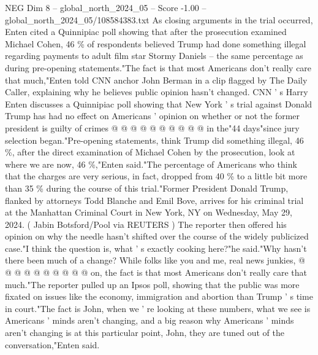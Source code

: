 \begin{textsample}{NEG Dim 8 – global\_north\_2024\_05 – Score -1.00 – global\_north\_2024\_05/108584383.txt}
As closing arguments in the trial occurred, Enten cited a Quinnipiac poll showing that after the prosecution examined Michael Cohen, 46 \% of respondents believed Trump had done something illegal regarding payments to adult film star Stormy Daniels -- the same percentage as during pre-opening statements."The fact is that most Americans don't really care that much,"Enten told CNN anchor John Berman in a clip flagged by The Daily Caller, explaining why he believes public opinion hasn't changed.
CNN ' s Harry Enten discusses a Quinnipiac poll showing that New York ' s trial against Donald Trump has had no effect on Americans ' opinion on whether or not the former president is guilty of crimes @ @ @ @ @ @ @ @ @ @ in the"44 days"since jury selection began."Pre-opening statements, think Trump did something illegal, 46 \%, after the direct examination of Michael Cohen by the prosecution, look at where we are now, 46 \%,"Enten said."The percentage of Americans who think that the charges are very serious, in fact, dropped from 40 \% to a little bit more than 35 \% during the course of this trial."Former President Donald Trump, flanked by attorneys Todd Blanche and Emil Bove, arrives for his criminal trial at the Manhattan Criminal Court in New York, NY on Wednesday, May 29, 2024. ( Jabin Botsford/Pool via REUTERS ) The reporter then offered his opinion on why the needle hasn't shifted over the course of the widely publicized case."I think the question is, what ' s exactly cooking here?"he said."Why hasn't there been much of a change?
While folks like you and me, real news junkies, @ @ @ @ @ @ @ @ @ @ on, the fact is that most Americans don't really care that much."The reporter pulled up an Ipsos poll, showing that the public was more fixated on issues like the economy, immigration and abortion than Trump ' s time in court."The fact is John, when we ' re looking at these numbers, what we see is Americans ' minds aren't changing, and a big reason why Americans ' minds aren't changing is at this particular point, John, they are tuned out of the conversation,"Enten said.

\end{textsample}
